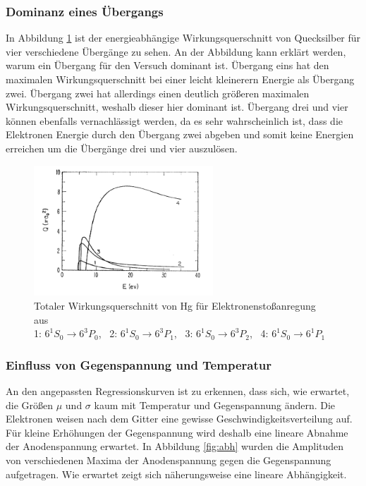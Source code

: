 \subsubsection{Dominanz eines Übergangs}
In Abbildung \ref{fig:wirkungsquerschnitt} ist der energieabhängige Wirkungsquerschnitt von Quecksilber für vier verschiedene Übergänge zu sehen. An der Abbildung kann erklärt werden, warum ein Übergang für den Versuch dominant ist. Übergang eins hat den maximalen Wirkungsquerschnitt bei einer leicht kleinerern Energie als Übergang zwei. Übergang zwei hat allerdings einen deutlich größeren maximalen Wirkungsquerschnitt, weshalb dieser hier dominant ist. Übergang drei und vier können ebenfalls vernachlässigt werden, da es sehr wahrscheinlich ist, dass die Elektronen Energie durch den Übergang zwei abgeben und somit keine Energien erreichen um die Übergänge drei und vier auszulösen.

\begin{figure}[h]
  \centering
  \includegraphics[width=0.6\textwidth]{data/fh/wirkungsquerschnitt.png}
  \caption{Totaler Wirkungsquerschnitt von Hg für Elektronenstoßanregung aus \cite{wirkungsquerschnitt}\\ 1: $6^1S_0\rightarrow 6^3P_0$, \   2: $6^1S_0\rightarrow 6^3P_1$, \   3: $6^1S_0\rightarrow 6^3P_2$, \   4: $6^1S_0\rightarrow 6^1P_1$}
  \label{fig:wirkungsquerschnitt}
\end{figure}

\subsubsection{Einfluss von Gegenspannung und Temperatur}
An den angepassten Regressionskurven ist zu erkennen, dass sich, wie erwartet, die Größen $\mu$ und $\sigma$ kaum mit Temperatur und Gegenspannung ändern. Die Elektronen weisen nach dem Gitter eine gewisse Geschwindigkeitsverteilung auf. Für kleine Erhöhungen der Gegenspannung wird deshalb eine lineare Abnahme der Anodenspannung erwartet. In Abbildung \ref{fig:abh} wurden die Amplituden von verschiedenen Maxima der Anodenspannung gegen die Gegenspannung aufgetragen. Wie erwartet zeigt sich näherungsweise eine lineare Abhängigkeit.


